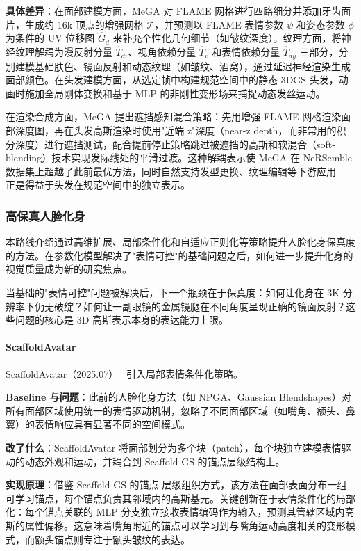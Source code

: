 \textbf{具体差异}：在面部建模方面，MeGA 对 FLAME 网格进行四路细分并添加牙齿面片，生成约 16k 顶点的增强网格 $\mathcal{T}$，并预测以 FLAME 表情参数 $\psi$ 和姿态参数 $\phi$ 为条件的 UV 位移图 $\hat{G}_d$ 来补充个性化几何细节（如皱纹深度）。纹理方面，将神经纹理解耦为漫反射分量 $\hat{T}_{di}$、视角依赖分量 $\hat{T}_v$ 和表情依赖分量 $\hat{T}_{dy}$ 三部分，分别建模基础肤色、镜面反射和动态纹理（如皱纹、酒窝），通过延迟神经渲染生成面部颜色。在头发建模方面，从选定帧中构建规范空间中的静态 3DGS 头发，动画时施加全局刚体变换和基于 MLP 的非刚性变形场来捕捉动态发丝运动。

在渲染合成方面，MeGA 提出遮挡感知混合策略：先用增强 FLAME 网格渲染面部深度图，再在头发高斯渲染时使用"近端 z"深度（near-z depth，而非常用的积分深度）进行遮挡测试，配合提前停止策略跳过被遮挡的高斯和软混合（soft-blending）技术实现发际线处的平滑过渡。这种解耦表示使 MeGA 在 NeRSemble 数据集上超越了此前最优方法，同时自然支持发型更换、纹理编辑等下游应用——正是得益于头发在规范空间中的独立表示。

\subsubsection{高保真人脸化身}

本路线介绍通过高维扩展、局部条件化和自适应正则化等策略提升人脸化身保真度的方法。在参数化模型解决了"表情可控"的基础问题之后，如何进一步提升化身的视觉质量成为新的研究焦点。

当基础的"表情可控"问题被解决后，下一个瓶颈在于保真度：如何让化身在 3K 分辨率下仍无破绽？如何让一副眼镜的金属镜腿在不同角度呈现正确的镜面反射？这些问题的核心是 3D 高斯表示本身的表达能力上限。

\paragraph{ScaffoldAvatar}

ScaffoldAvatar（2025.07）~\cite{2507_10542} 引入局部表情条件化策略。

\textbf{Baseline 与问题}：此前的人脸化身方法（如 NPGA、Gaussian Blendshapes）对所有面部区域使用统一的表情驱动机制，忽略了不同面部区域（如嘴角、额头、鼻翼）的表情响应具有显著不同的空间模式。

\textbf{改了什么}：ScaffoldAvatar 将面部划分为多个块（patch），每个块独立建模表情驱动的动态外观和运动，并耦合到 Scaffold-GS 的锚点层级结构上。

\textbf{实现原理}：借鉴 Scaffold-GS 的锚点-层级组织方式，该方法在面部表面分布一组可学习锚点，每个锚点负责其邻域内的高斯基元。关键创新在于表情条件化的局部化：每个锚点关联的 MLP 分支独立接收表情编码作为输入，预测其管辖区域内高斯的属性偏移。这意味着嘴角附近的锚点可以学习到与嘴角运动高度相关的变形模式，而额头锚点则专注于额头皱纹的表达。


